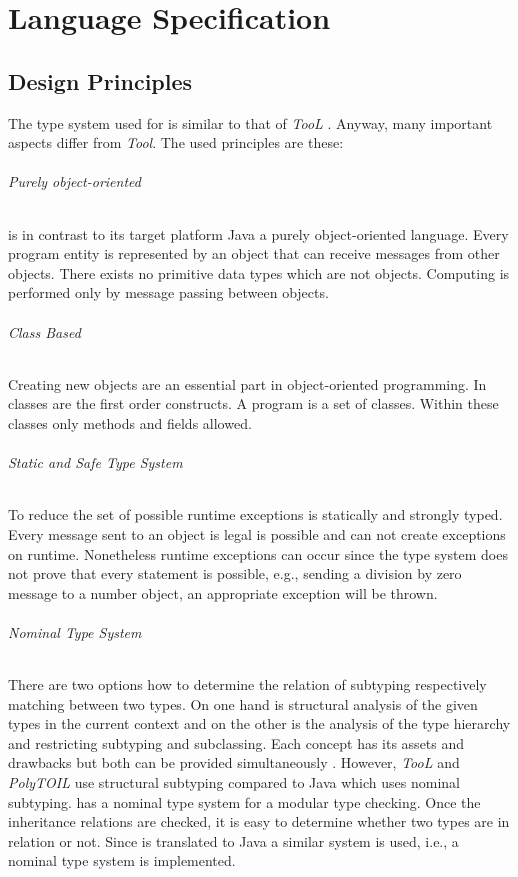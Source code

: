 \part{Language Specification}
\chapter{Design Principles}
The type system used for \ooplss is similar to that of \emph{TooL}
\cite{gawecki_tool:_1995}. Anyway, many important aspects differ from
\emph{Tool}. The used principles are these:

\paragraph{Purely object-oriented}
\ooplss is in contrast to its target platform Java a purely
object-oriented language. Every program entity is represented by an
object that can receive messages from other objects. There exists no
primitive data types which are not objects. Computing is performed only
by message passing between objects.

\paragraph{Class Based}
Creating new objects are an essential part in object-oriented
programming. In \ooplss classes are the first order constructs. A program is
a set of classes. Within these classes only methods and fields allowed.

\paragraph{Static and Safe Type System}
To reduce the set of possible runtime exceptions \ooplss is statically
and strongly typed. Every message sent to an object is legal is possible
and can not create exceptions on runtime. Nonetheless runtime exceptions
can occur since the type system does not prove that every statement is
possible, e.g., sending a division by zero message to a number object,
an appropriate exception will be thrown.

\paragraph{Nominal Type System}
There are two options how to determine the relation of subtyping
respectively matching between two types. On one hand is structural
analysis of the given types in the current context and on the other
is the analysis of the type hierarchy and restricting subtyping and
subclassing. Each concept has its assets and drawbacks but both can
be provided simultaneously \cite{malayeri_integrating_2008}. However,
\emph{TooL} and \emph{PolyTOIL} use structural subtyping compared to
Java which uses nominal subtyping. \ooplss has a nominal type system
for a modular type checking. Once the inheritance relations are checked,
it is easy to determine whether two types are in relation or not. Since
\ooplss is translated to Java a similar system is used, i.e., a nominal
type system is implemented.

